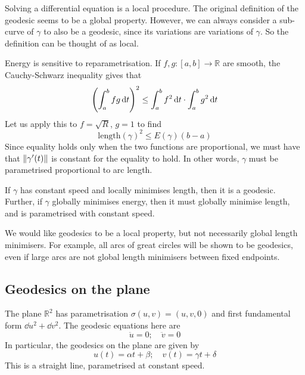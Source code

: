 \begin{remark}
	Solving a differential equation is a local procedure.
	The original definition of the geodesic seems to be a global property.
	However, we can always consider a sub-curve of \( \gamma \) to also be a geodesic, since its variations are variations of \( \gamma \).
	So the definition can be thought of as local.

	Energy is sensitive to reparametrisation.
	If \( f, g \colon [a,b] \to \mathbb R \) are smooth, the Cauchy-Schwarz inequality gives that
	\[
		\qty(\int_a^b fg \dd{t})^2 \leq \int_a^b f^2 \dd{t} \cdot \int_a^b g^2 \dd{t}
	\]
	Let us apply this to \( f = \sqrt{R} \), \( g = 1 \) to find
	\[
		\mathrm{length}(\gamma)^2 \leq E(\gamma)(b-a)
	\]
	Since equality holds only when the two functions are proportional, we must have that \( \norm{\gamma'(t)} \) is constant for the equality to hold.
	In other words, \( \gamma \) must be parametrised proportional to arc length.
\end{remark}
\begin{corollary}
	If \( \gamma \) has constant speed and locally minimises length, then it is a geodesic.
	Further, if \( \gamma \) globally minimises energy, then it must globally minimise length, and is parametrised with constant speed.
\end{corollary}
\begin{remark}
	We would like geodesics to be a local property, but not necessarily global length minimisers.
	For example, all arcs of great circles will be shown to be geodesics, even if large arcs are not global length minimisers between fixed endpoints.
\end{remark}

\subsection{Geodesics on the plane}
The plane \( \mathbb R^2 \) has parametrisation \( \sigma(u,v) = (u,v,0) \) and first fundamental form \( \dd{u}^2 + \dd{v}^2 \).
The geodesic equations here are
\[
	\ddot u = 0;\quad \ddot v = 0
\]
In particular, the geodesics on the plane are given by
\[
	u(t) = \alpha t + \beta;\quad v(t) = \gamma t + \delta
\]
This is a straight line, parametrised at constant speed.

